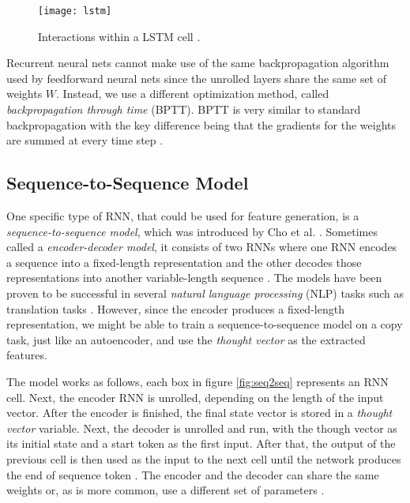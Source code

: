 \begin{figure}[ht]
  \centering
  \texttt{[image: lstm]}
  \caption{Interactions within a LSTM cell \cite{LSTM}.}
  \label{fig:lstm}
\end{figure}

Recurrent neural nets cannot make use of the same backpropagation algorithm used by feedforward neural nets since the unrolled layers share the same set of weights $W$.
Instead, we use a different optimization method, called \textit{backpropagation through time} (BPTT).
BPTT is very similar to standard backpropagation with the key difference being that the gradients for the weights are summed at every time step \cite{britz_2016}.

\subsection{Sequence-to-Sequence Model} \label{sec:seq2seq}

One specific type of RNN, that could be used for feature generation, is a \textit{sequence-to-sequence model}, which was introduced by Cho et al. \cite{cho2014learning}.
Sometimes called a \textit{encoder-decoder model}, it consists of two RNNs where one RNN encodes a sequence into a fixed-length representation and the other decodes those representations into another variable-length sequence \cite{cho2014learning}.
The models have been proven to be successful in several \textit{natural language processing} (NLP) tasks such as translation tasks \cite{cho2014learning,sutskever_vinyals_le,tensorflowseq2seq}.
However, since the encoder produces a fixed-length representation, we might be able to train a sequence-to-sequence model on a copy task, just like an autoencoder, and use the \textit{thought vector} as the extracted features.

The model works as follows, each box in figure \ref{fig:seq2seq} represents an RNN cell. Next, the encoder RNN is unrolled, depending on the length of the input vector.
After the encoder is finished, the final state vector is stored in a \textit{thought vector} variable.
Next, the decoder is unrolled and run, with the though vector as its initial state and a start token as the first input.
After that, the output of the previous cell is then used as the input to the next cell until the network produces the end of sequence token \cite{cho2014learning}.
The encoder and the decoder can share the same weights or, as is more common, use a different set of parameters \cite{tensorflowseq2seq}.

